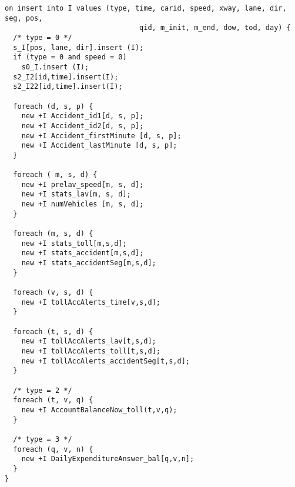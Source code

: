 \pagebreak
\begin{verbatim}
on insert into I values (type, time, carid, speed, xway, lane, dir, seg, pos, 
                                qid, m_init, m_end, dow, tod, day) {
  /* type = 0 */
  s_I[pos, lane, dir].insert (I);
  if (type = 0 and speed = 0)
    s0_I.insert (I);
  s2_I2[id,time].insert(I);
  s2_I22[id,time].insert(I);

  foreach (d, s, p) {
    new +I Accident_id1[d, s, p];
    new +I Accident_id2[d, s, p];
    new +I Accident_firstMinute [d, s, p];
    new +I Accident_lastMinute [d, s, p];
  }
  
  foreach ( m, s, d) {
    new +I prelav_speed[m, s, d];
    new +I stats_lav[m, s, d];
    new +I numVehicles [m, s, d];
  }
  
  foreach (m, s, d) {
    new +I stats_toll[m,s,d];
    new +I stats_accident[m,s,d];
    new +I stats_accidentSeg[m,s,d];
  }
  
  foreach (v, s, d) {
    new +I tollAccAlerts_time[v,s,d];
  }
  
  foreach (t, s, d) {
    new +I tollAccAlerts_lav[t,s,d];
    new +I tollAccAlerts_toll[t,s,d];
    new +I tollAccAlerts_accidentSeg[t,s,d];
  }
  
  /* type = 2 */
  foreach (t, v, q) {
    new +I AccountBalanceNow_toll(t,v,q);
  }
  
  /* type = 3 */
  foreach (q, v, n) {
    new +I DailyExpenditureAnswer_bal[q,v,n];
  }
}
\end{verbatim}
\begin{comment}

\end{comment}